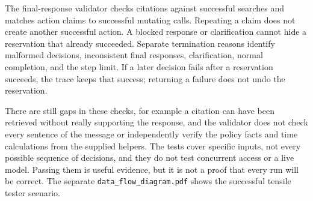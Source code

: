 \documentclass[11pt,letterpaper]{article}
\begin{document}
The final-response validator checks citations against successful searches and matches action claims to successful mutating calls. Repeating a claim does not create another successful action. A blocked response or clarification cannot hide a reservation that already succeeded. Separate termination reasons identify malformed decisions, inconsistent final responses, clarification, normal completion, and the step limit. If a later decision fails after a reservation succeeds, the trace keeps that success; returning a failure does not undo the reservation.

There are still gaps in these checks, for example a citation can have been retrieved without really supporting the response, and the validator does not check every sentence of the message or independently verify the policy facts and time calculations from the supplied helpers. The tests cover specific inputs, not every possible sequence of decisions, and they do not test concurrent access or a live model. Passing them is useful evidence, but it is not a proof that every run will be correct. The separate \texttt{data\_flow\_diagram.pdf} shows the successful tensile tester scenario.
\end{document}
